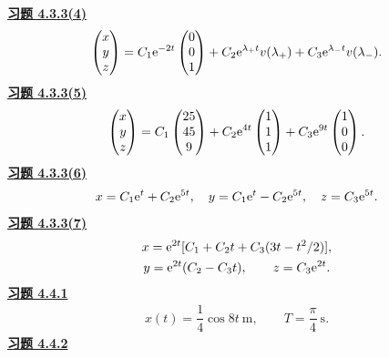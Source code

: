 \noindent\textbf{\hyperref[q:4.3.3(4)]{习题 4.3.3(4)}}
\[\begin{gathered}\begin{pmatrix}x\\y\\z\end{pmatrix}=C_1\mathrm e^{-2t}\begin{pmatrix}0\\0\\1\end{pmatrix}
+C_2\mathrm e^{\lambda_+t}v(\lambda_+)+C_3\mathrm e^{\lambda_-t}v(\lambda_-).\end{gathered}\]
\noindent\textbf{\hyperref[q:4.3.3(5)]{习题 4.3.3(5)}}
\[\begin{gathered}\begin{pmatrix}x\\y\\z\end{pmatrix}
=C_1\begin{pmatrix}25\\45\\9\end{pmatrix}
+C_2\mathrm e^{4t}\begin{pmatrix}1\\1\\1\end{pmatrix}
+C_3\mathrm e^{9t}\begin{pmatrix}1\\0\\0\end{pmatrix}.\end{gathered}\]
\noindent\textbf{\hyperref[q:4.3.3(6)]{习题 4.3.3(6)}}
\[\begin{gathered}x=C_1\mathrm e^t+C_2\mathrm e^{5t},\quad y=C_1\mathrm e^t-C_2\mathrm e^{5t},\quad z=C_3\mathrm e^{5t}.\end{gathered}\]
\noindent\textbf{\hyperref[q:4.3.3(7)]{习题 4.3.3(7)}}
\[\begin{gathered}x=\mathrm e^{2t}[C_1+C_2t+C_3(3t-t^2/2)],\\
y=\mathrm e^{2t}(C_2-C_3t),\qquad z=C_3\mathrm e^{2t}.\end{gathered}\]
\noindent\textbf{\hyperref[q:4.4.1]{习题 4.4.1}}
\[\begin{gathered}x(t)=\dfrac14\cos8t\ \mathrm m,\qquad T=\dfrac\pi4\ \mathrm s.\end{gathered}\]
\noindent\textbf{\hyperref[q:4.4.2]{习题 4.4.2}}
